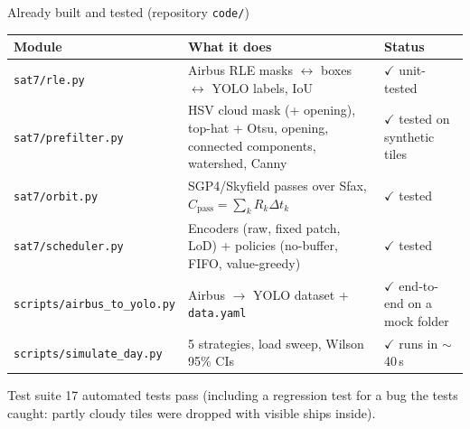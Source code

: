 \documentclass[aspectratio=169,10pt]{beamer}
\newcommand{\ok}{\textcolor{good}{$\checkmark$}}
\begin{document}
\begin{frame}{Already built and tested (repository \texttt{code/})}
\footnotesize
\renewcommand{\arraystretch}{1.15}
\begin{tabularx}{\textwidth}{@{}P{3.1cm} L P{3.4cm}@{}}
\toprule
\textbf{Module} & \textbf{What it does} & \textbf{Status} \\
\midrule
\texttt{sat7/rle.py} & Airbus RLE masks $\leftrightarrow$ boxes $\leftrightarrow$ YOLO labels, IoU & \ok{} unit-tested \\
\texttt{sat7/prefilter.py} & HSV cloud mask (+ opening), top-hat + Otsu, opening, connected components, watershed, Canny & \ok{} tested on synthetic tiles \\
\texttt{sat7/orbit.py} & SGP4/Skyfield passes over Sfax, $C_{\text{pass}}=\sum_k R_k\Delta t_k$ & \ok{} tested \\
\texttt{sat7/scheduler.py} & Encoders (raw, fixed patch, LoD) + policies (no-buffer, FIFO, value-greedy) & \ok{} tested \\
\texttt{scripts/airbus\_to\_yolo.py} & Airbus $\rightarrow$ YOLO dataset + \texttt{data.yaml} & \ok{} end-to-end on a mock folder \\
\texttt{scripts/simulate\_day.py} & 5 strategies, load sweep, Wilson 95\% CIs & \ok{} runs in $\sim$40\,s \\
\bottomrule
\end{tabularx}
\vspace{2mm}
\begin{exampleblock}{Test suite}
\footnotesize 17 automated tests pass (including a regression test for a bug the tests caught: partly cloudy tiles were dropped with visible ships inside).
\end{exampleblock}
\end{frame}
\end{document}
